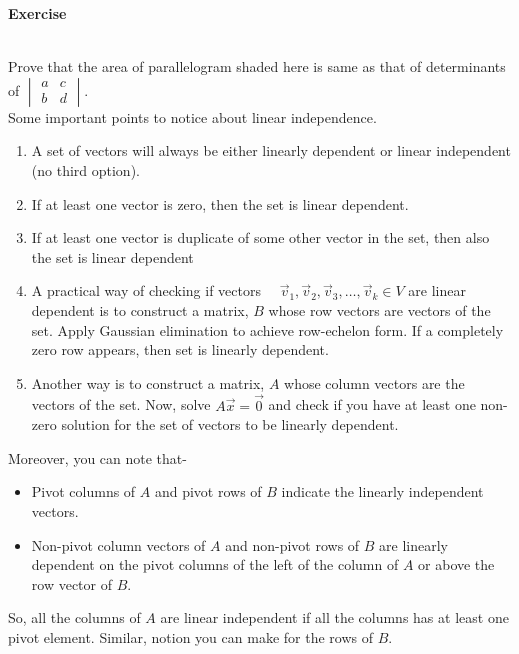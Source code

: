 \documentclass{article}
\begin{document}
\textbf{Exercise}
\\
Prove that the area of parallelogram shaded here is same as that of determinants of \(\begin{vmatrix} a & c \\ b & d \end{vmatrix}\).\\

Some important points to notice about linear independence.
\begin{enumerate}
    \item A set of vectors will always be either linearly dependent or linear independent (no third option).
    \item If at least one vector is zero, then the set is linear dependent.
    \item If at least one vector is duplicate of some other vector in the set, then also the set is linear dependent
    \item A practical way of checking if vectors ~~$\vec{v}_1, \vec{v}_2, \vec{v}_3, \dots, \vec{v}_k \in V$ are linear dependent is to construct a  matrix, $B$ whose row vectors are vectors of the set. Apply Gaussian elimination to achieve row-echelon form. If a completely zero row appears, then set is linearly dependent.
    \item Another way is to construct a matrix, $A$ whose column vectors are the vectors of the set. Now, solve $A\vec{x}=\vec{0}$ and check if you have at least one non-zero solution for the set of vectors to be linearly dependent.
\end{enumerate}
Moreover, you can note that-
\begin{itemize}
    \item Pivot columns of $A$ and pivot rows of $B$ indicate the linearly independent vectors.
    \item Non-pivot column vectors of $A$ and non-pivot rows of $B$ are linearly dependent on the pivot columns of the left of the column of $A$ or above the row vector of $B$.
\end{itemize}
So, all the columns of $A$ are linear independent if all the columns has at least one pivot element. Similar, notion you can make for the rows of $B$.\\
\end{document}
